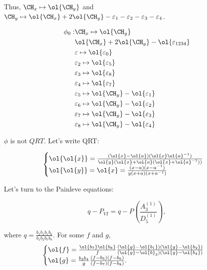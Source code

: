 \documentclass[11pt]{scrartcl}
\begin{document}
  Thus, $\CH_{x} \mapsto \ol{\CH_{y}}$ and
  $\CH_{y} \mapsto \ol{\CH_{x}} + 2 \ol{\CH_{y}} - \varepsilon_{1} -
  \varepsilon_{2} - \varepsilon_{3} - \varepsilon_{4}$.

  \begin{exercise}

    \begin{align}
      \phi_{0}: &\CH_{x}\mapsto \ol{\CH_{y}}\\
                & \ol{\CH_{x}} + 2\ol{\CH_{y}} -\ol{\varepsilon_{1234}}\\
                & \varepsilon \mapsto \ol{\varepsilon_{0}}\\
                & \varepsilon_{2} \mapsto \ol{\varepsilon_{5}}\\
                & \varepsilon_{3} \mapsto \ol{\varepsilon_{8}}\\
                & \varepsilon_{4} \mapsto \ol{\varepsilon_{7}}\\
                & \varepsilon_{5} \mapsto \ol{\CH_{y}} - \ol{\varepsilon_{1}}\\
                & \varepsilon_{6} \mapsto \ol{\CH_{y}} - \ol{\varepsilon_{2}}\\
                & \varepsilon_{7} \mapsto \ol{\CH_{y}} - \ol{\varepsilon_{3}}\\
                & \varepsilon_{8} \mapsto \ol{\CH_{y}} - \ol{\varepsilon_{4}}
    \end{align}

  \end{exercise}

  $\phi$ is not $QRT$. Let's write QRT:
  
  \begin{equation*}
    \begin{cases}
      \ol{\ol{x}} = \frac{(\ol{x} - \ol{a})(\ol{x} \ol{a}^{-1})}{\ol{y}(\ol{x}+\ol{a}(\ol{x} + \ol{a}^{-1}))}\\
      \ol{\ol{y}} = \ol{x} = \frac{(x-a)(x-a^{-1})}{y(x+a)(x+a^{-1})}
    \end{cases}
  \end{equation*}

  Let's turn to the Painleve  equations:
  
  \begin{equation*}
    q - P_{VI} = q- P(\frac{A_{3}^{(1)}}{D_{5}^{(1)}}),
  \end{equation*}

  where $q = \frac{b_{2}b_{4}b_{5}b_{6}}{b_{1}b_{2}b_{7}b_{8}}$.
  For some $f$ and $g$,
  \begin{equation*}
    \begin{cases}
      \ol{f} = \frac{\ol{b_{7}}\ol{b_{8}}}{f} \frac{(\ol{g} -
        \ol{b_{1}})(\ol{g}-\ol{b_{2}})}{(\ol{g} - \ol{b}_{3})(\ol{g} -
        \ol{b_{4}})}\\
      \ol{g} = \frac{b_{3}b_{4}}{g} \frac{(f-b_{5})(f-b_{6})}{(f-b_{7})(f-b_{8})}.
    \end{cases}
  \end{equation*}  
\end{document}
